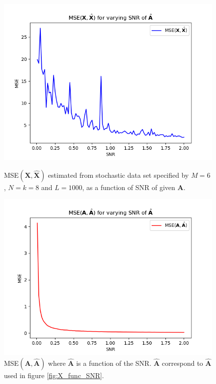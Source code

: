 \begin{figure}[H]
    \begin{minipage}[t]{.45\textwidth}
    	\centering
		\includegraphics[scale=0.5]{figures/ch_6/X_func_SNR.png}
		\caption{MSE$(\mathbf{X},\hat{\mathbf{X}})$ estimated from stochastic data set specified by $M = 6$, $N = k = 8$ and $L = 1000$, as a function of SNR of given $\mathbf{A}$.}
		\label{fig:X_func_SNR}
    \end{minipage} 
    \hfill
    \begin{minipage}[t]{.45\textwidth}
        \centering
		\includegraphics[scale=0.5]{figures/ch_6/A_func_SNR.png}
		\caption{MSE$(\mathbf{A}, \hat{\mathbf{A}})$ where $\hat{\mathbf{A}}$ is a function of the SNR. $\hat{\mathbf{A}}$ correspond to $\hat{\mathbf{A}}$ used in figure \ref{fig:X_func_SNR}.}
		\label{fig:A_func_SNR}
    \end{minipage}
\end{figure}
\noindent